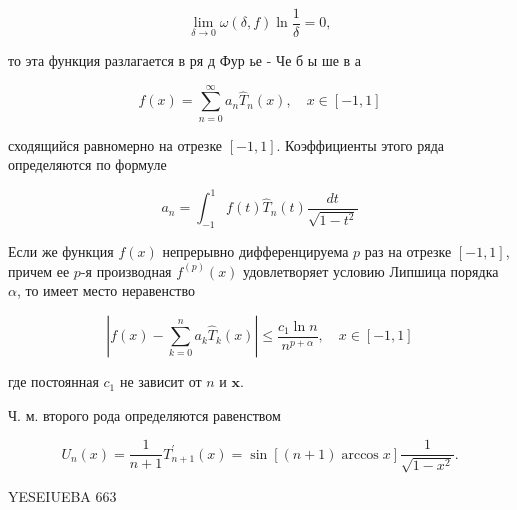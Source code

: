 \documentclass[10pt]{article}
\begin{document}
\[

\lim _{\delta \rightarrow 0} \omega(\delta, f) \ln \frac{1}{\delta}=0,

\]



то эта функция разлагается в ря д Фур ье - Че б ы ше в а



\[

f(x)=\sum_{n=0}^{\infty} a_{n} \hat{T}_{n}(x), \quad x \in[-1,1]

\]



сходящийся равномерно на отрезке $[-1,1]$. Коэффициенты этого ряда определяются по формуле



\[

a_{n}=\int_{-1}^{1} f(t) \hat{T}_{n}(t) \frac{d t}{\sqrt{1-t^{2}}}

\]



Если же функция $f(x)$ непрерывно дифференцируема $p$ раз на отрезке $[-1,1]$, причем ее $p$-я производная $f^{(p)}(x)$ удовлетворяет условию Липшица порядка $\alpha$, то имеет место неравенство



\[

\left|f(x)-\sum_{k=0}^{n} a_{k} \hat{T}_{k}(x)\right| \leqslant \frac{c_{1} \ln n}{n^{p+\alpha}}, \quad x \in[-1,1]

\]



где постоянная $c_{1}$ не зависит от $n$ и $\boldsymbol{x}$.



Ч. м. второго рода определяются равенством



\[

U_{n}(x)=\frac{1}{n+1} T_{n+1}^{\prime}(x)=\sin [(n+1) \arccos x] \frac{1}{\sqrt{1-x^{2}}} .

\]



YESEIUEBA 663
\end{document}
